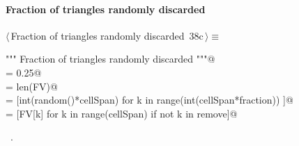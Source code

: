 \documentclass[11pt,oneside]{article}    %
\begin{document}
\paragraph{Fraction of triangles randomly discarded}
\begin{flushleft} \small \label{scrap62}
\protect{}$\langle\,$Fraction of triangles randomly discarded\nobreak\ {\footnotesize 38c}$\,\rangle\equiv$
\vspace{-1ex}
\begin{list}{}{} \item
\mbox{}\verb@""" Fraction of triangles randomly discarded """@\\
\mbox{}\verb@fraction = 0.25@\\
\mbox{}\verb@cellSpan = len(FV)@\\
\mbox{}\verb@remove = [int(random()*cellSpan) for k in range(int(cellSpan*fraction)) ]@\\
\mbox{}\verb@FV = [FV[k] for k in range(cellSpan) if not k in remove]@\\
\mbox{}\verb@@{\NWsep}
\end{list}
\vspace{-1ex}
\footnotesize\addtolength{\baselineskip}{-1ex}
\begin{list}{}{\setlength{\itemsep}{-\parsep}\setlength{\itemindent}{-\leftmargin}}
\item \NWtxtMacroRefIn\ .
\end{list}
\end{flushleft}
\end{document}
